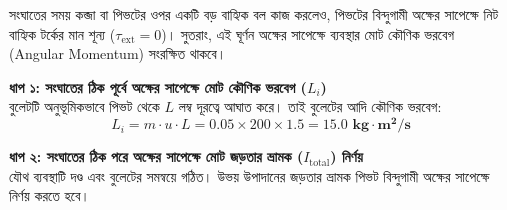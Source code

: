 \documentclass[12pt, a4paper]{article}
\begin{document}
\vspace{1em}


\begin{tcolorbox}[solutionbox={সমাধান (Solution)}]
\noindent
সংঘাতের সময় কব্জা বা পিভটের ওপর একটি বড় বাহ্যিক বল কাজ করলেও, পিভটের বিন্দুগামী অক্ষের সাপেক্ষে নিট বাহ্যিক টর্কের মান শূন্য ($\tau_{\text{ext}} = 0$)। সুতরাং, এই ঘূর্ণন অক্ষের সাপেক্ষে ব্যবস্থার মোট কৌণিক ভরবেগ (Angular Momentum) সংরক্ষিত থাকবে।

\vspace{0.5em}
\noindent
\textbf{ধাপ ১: সংঘাতের ঠিক পূর্বে অক্ষের সাপেক্ষে মোট কৌণিক ভরবেগ ($L_i$)} \\
বুলেটটি অনুভূমিকভাবে পিভট থেকে $L$ লম্ব দূরত্বে আঘাত করে। তাই বুলেটের আদি কৌণিক ভরবেগ:
$$L_i = m \cdot u \cdot L = 0.05 \times 200 \times 1.5 = \mathbf{15.0\text{ kg}\cdot\text{m}^2/\text{s}}$$

\vspace{0.5em}
\noindent
\textbf{ধাপ ২: সংঘাতের ঠিক পরে অক্ষের সাপেক্ষে মোট জড়তার ভ্রামক ($I_{\text{total}}$) নির্ণয়} \\
যৌথ ব্যবস্থাটি দণ্ড এবং বুলেটের সমন্বয়ে গঠিত। উভয় উপাদানের জড়তার ভ্রামক পিভট বিন্দুগামী অক্ষের সাপেক্ষে নির্ণয় করতে হবে।

\vspace{1em}
\begin{center}
\end{center}
\end{tcolorbox}
\end{document}
